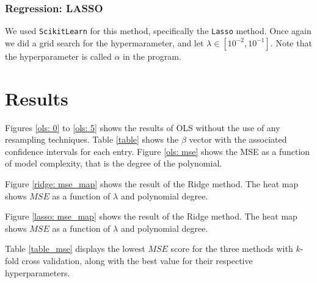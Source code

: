\documentclass[reprint,english,notitlepage]{revtex4-1}  %
\begin{document}
\subsubsection{Regression: LASSO}
We used \texttt{ScikitLearn} for this method, specifically the \texttt{Lasso} method. Once again we did a grid search for the hypermarameter, and let $\lambda \in [10^{-2}, 10^{-1}]$. Note that the hyperparameter is called $\alpha$ in the program.

\section{Results}
Figures \ref{ols: 0} to \ref{ols: 5} shows the results of OLS without the use of any resampling techniques. Table \ref{table} shows the $\beta$ vector with the associated confidence intervals for each entry. Figure \ref{ols: mse} shows the MSE as a function of model complexity, that is the degree of the polynomial.

Figure \ref{ridge: mse_map} shows the result of the Ridge method. The heat map shows $MSE$ as a function of $\lambda$ and polynomial degree.

Figure \ref{lasso: mse_map} shows the result of the Ridge method. The heat map shows $MSE$ as a function of $\lambda$ and polynomial degree.

Table \ref{table_mse} displays the lowest $MSE$ score for the three methods with $k$-fold cross validation, along with the best value for their respective hyperparameters.
\end{document}
